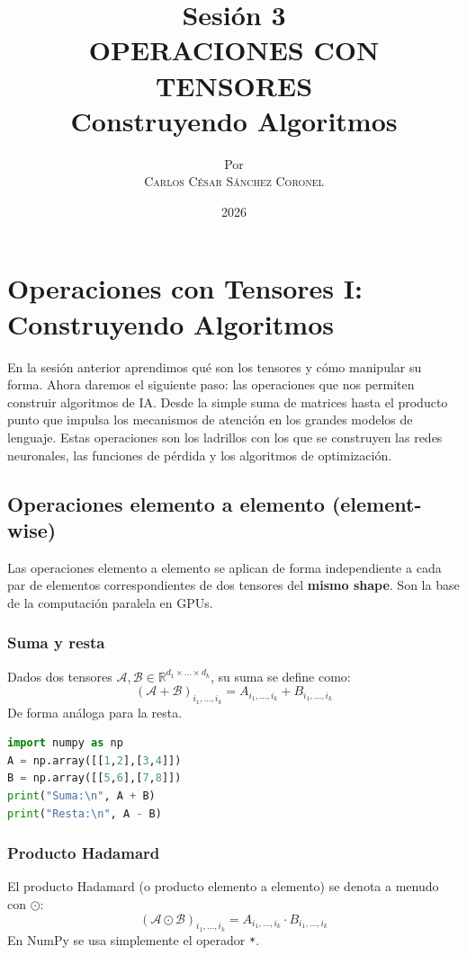 \documentclass[12pt,a4paper,openany,oneside]{book}
\title{
    \textbf{Sesión 3} \\ 
    \Huge \textbf{OPERACIONES CON TENSORES} \\
    \Large Construyendo Algoritmos \\

}
\author{
    \small Por \\ \vspace{0.2cm}
    \Large \textsc{Carlos César Sánchez Coronel}
}
\date{2026}
\begin{document}
\maketitle
\tableofcontents
{}

\chapter{Operaciones con Tensores I: Construyendo Algoritmos}

En la sesión anterior aprendimos qué son los tensores y cómo manipular su forma. Ahora daremos el siguiente paso: las operaciones que nos permiten construir algoritmos de IA. Desde la simple suma de matrices hasta el producto punto que impulsa los mecanismos de atención en los grandes modelos de lenguaje. Estas operaciones son los ladrillos con los que se construyen las redes neuronales, las funciones de pérdida y los algoritmos de optimización.

\section{Operaciones elemento a elemento (element-wise)}

Las operaciones elemento a elemento se aplican de forma independiente a cada par de elementos correspondientes de dos tensores del \textbf{mismo shape}. Son la base de la computación paralela en GPUs.

\subsection{Suma y resta}
Dados dos tensores $\mathcal{A}, \mathcal{B} \in \mathbb{R}^{d_1 \times \dots \times d_k}$, su suma se define como:
\begin{equation*}
(\mathcal{A} + \mathcal{B})_{i_1,\dots,i_k} = A_{i_1,\dots,i_k} + B_{i_1,\dots,i_k}
\end{equation*}
De forma análoga para la resta.

\begin{lstlisting}[language=Python]
import numpy as np
A = np.array([[1,2],[3,4]])
B = np.array([[5,6],[7,8]])
print("Suma:\n", A + B)
print("Resta:\n", A - B)
\end{lstlisting}

\subsection{Producto Hadamard}
El producto Hadamard (o producto elemento a elemento) se denota a menudo con $\odot$:
\begin{equation*}
(\mathcal{A} \odot \mathcal{B})_{i_1,\dots,i_k} = A_{i_1,\dots,i_k} \cdot B_{i_1,\dots,i_k}
\end{equation*}
En NumPy se usa simplemente el operador \texttt{*}.
\end{document}
